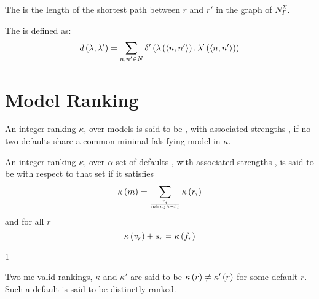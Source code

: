 \begin{defi}
The  is the length of the shortest path between $r$ and $r'$ in the graph of $N_{\Gamma}^X$.
\cite{conf/ijcai/EuzenatLD03}
\end{defi}

\begin{defi}
The  is defined as:
\begin{equation}
d\left(\lambda,\lambda'\right)=\displaystyle\sum_{n,n'\in N}\delta'\left(\lambda\left(\left\langle n,n'\right\rangle\right),\lambda'\left(\left\langle n,n'\right\rangle\right)\right)
\end{equation}
\cite{conf/ijcai/EuzenatLD03}
\end{defi}

\section{Model Ranking}

\begin{defi}
An integer ranking $\kappa$, over models is said to be  , with associated strengths , if no two defaults share a common minimal falsifying model in $\kappa$.
\cite{conf/ijcai/BourneP99}
\end{defi}

\begin{defi}
An integer ranking $\kappa$, over $\alpha$ set of defaults , with associated strengths , is said to be  with respect to that set if it satisfies
\begin{equation}
\kappa\left(m\right)=\displaystyle\sum_{\frac{r_i}{m\vDash a_i\wedge\neg b_i}}{\kappa\left(r_i\right)}
\end{equation}
and for all $r$
\begin{equation}
\kappa\left(v_r\right)+s_r=\kappa\left(f_r\right)
\end{equation}
\cite{conf/ijcai/BourneP99}
\end{defi}

1\begin{defi}
Two me-valid rankings, $\kappa$ and $\kappa'$ are said to be  \iffTx{} $\kappa\left(r\right)\neq\kappa'\left(r\right)$ for some default $r$. Such a default is said to be distinctly ranked.
\cite{conf/ijcai/BourneP99}
\end{defi}


